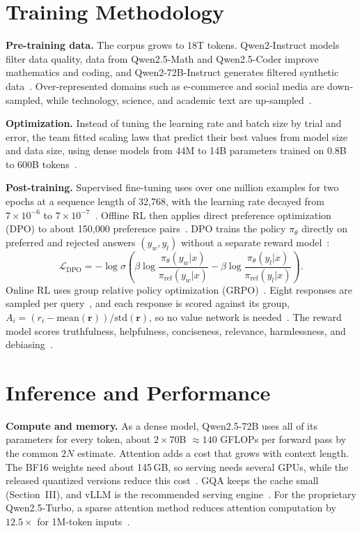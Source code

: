 \documentclass[conference]{IEEEtran}
\begin{document}
\section{Training Methodology}
\textbf{Pre-training data.} The corpus grows to 18T tokens. Qwen2-Instruct models filter data quality, data from Qwen2.5-Math and Qwen2.5-Coder improve mathematics and coding, and Qwen2-72B-Instruct generates filtered synthetic data~\cite{qwen25}. Over-represented domains such as e-commerce and social media are down-sampled, while technology, science, and academic text are up-sampled~\cite{qwen25}.

\textbf{Optimization.} Instead of tuning the learning rate and batch size by trial and error, the team fitted scaling laws that predict their best values from model size and data size, using dense models from 44M to 14B parameters trained on 0.8B to 600B tokens~\cite{qwen25}.

\textbf{Post-training.} Supervised fine-tuning uses over one million examples for two epochs at a sequence length of 32,768, with the learning rate decayed from $7\times10^{-6}$ to $7\times10^{-7}$~\cite{qwen25}. Offline RL then applies direct preference optimization (DPO) to about 150,000 preference pairs~\cite{qwen25}. DPO trains the policy $\pi_\theta$ directly on preferred and rejected answers $(y_w,y_l)$ without a separate reward model~\cite{dpo}:
\begin{equation}
\mathcal{L}_{\mathrm{DPO}}=-\log\sigma\!\left(\beta\log\frac{\pi_\theta(y_w|x)}{\pi_{\mathrm{ref}}(y_w|x)}-\beta\log\frac{\pi_\theta(y_l|x)}{\pi_{\mathrm{ref}}(y_l|x)}\right).
\end{equation}
Online RL uses group relative policy optimization (GRPO)~\cite{grpo}. Eight responses are sampled per query~\cite{qwen25}, and each response is scored against its group, $A_i=(r_i-\mathrm{mean}(\mathbf{r}))/\mathrm{std}(\mathbf{r})$, so no value network is needed~\cite{grpo}. The reward model scores truthfulness, helpfulness, conciseness, relevance, harmlessness, and debiasing~\cite{qwen25}.

\section{Inference and Performance}
\textbf{Compute and memory.} As a dense model, Qwen2.5-72B uses all of its parameters for every token, about $2\times70$B $\approx140$ GFLOPs per forward pass by the common $2N$ estimate. Attention adds a cost that grows with context length. The BF16 weights need about 145\,GB, so serving needs several GPUs, while the released quantized versions reduce this cost~\cite{qwen25}. GQA keeps the cache small (Section~III), and vLLM is the recommended serving engine~\cite{qwen25card}. For the proprietary Qwen2.5-Turbo, a sparse attention method reduces attention computation by $12.5\times$ for 1M-token inputs~\cite{qwen25}.
\end{document}
